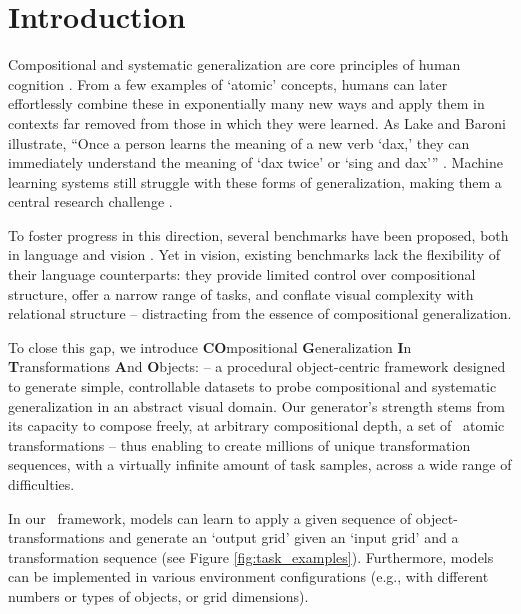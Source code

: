 \section{Introduction}

Compositional and systematic generalization are core principles of human cognition \cite{fodor1988connectionism}. From a few examples of `atomic' concepts, humans can later effortlessly combine these in exponentially many new ways and apply them in contexts far removed from those in which they were learned. As Lake and Baroni illustrate, ``Once a person learns the meaning of a new verb ‘dax,’ they can immediately understand the meaning of ‘dax twice’ or ‘sing and dax’'' \cite{SCAN_lake_baroni}. Machine learning systems still struggle with these forms of generalization, making them a central research challenge \cite{galke2024deep, besold2016generality, wiedemer2023compositional, lake_baroni_2023, keysers2019measuring, xu2022compositional, wiedemer2023provable, brady2023provably}.

To foster progress in this direction, several benchmarks have been proposed, both in language \cite{SCAN_lake_baroni, schug2023discovering, keysers2019measuring, kim2020cogs, hupkes2020compositionality} and vision \cite{clevr, cvr2022, barrett2018measuring, fleuret2011comparing, mondorf2025enabling, girdhar2019cater}. Yet in vision, existing benchmarks lack the flexibility of their language counterparts: they provide limited control over compositional structure, offer a narrow range of tasks, and conflate visual complexity with relational structure -- distracting from the essence of compositional generalization.

To close this gap, we introduce \textbf{CO}mpositional \textbf{G}eneralization \textbf{I}n \textbf{T}ransformations \textbf{A}nd \textbf{O}bjects: \textbf{\generatorName} -- a procedural object-centric framework designed to generate simple, controllable datasets to probe compositional and systematic generalization in an abstract visual domain. Our generator's strength stems from its capacity to compose freely, at arbitrary compositional depth, a set of \ntransforms\ atomic transformations -- thus enabling to create millions of unique transformation sequences, with a virtually infinite amount of task samples, across a wide range of difficulties. 

In our \generatorName\ framework, models can learn to apply a given sequence of object-transformations and generate an `output grid' given an `input grid' and a transformation sequence (see Figure \ref{fig:task_examples}). Furthermore, models can be implemented in various environment configurations (e.g., with different numbers or types of objects, or grid dimensions). 

